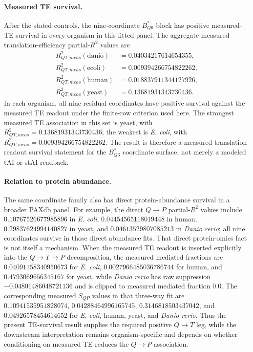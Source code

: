 \paragraph{Measured TE survival.}
After the stated controls, the nine-coordinate $B^{\ast}_{Q6}$ block has positive measured-TE survival in every organism in this fitted panel.  The aggregate measured translation-efficiency partial-$R^2$ values are
$$
\begin{aligned}
R^2_{QT,meas}(\mathrm{danio}) &= 0.04034217614654355,\\
R^2_{QT,meas}(\mathrm{ecoli}) &= 0.009394266754822262,\\
R^2_{QT,meas}(\mathrm{human}) &= 0.018837911344127926,\\
R^2_{QT,meas}(\mathrm{yeast}) &= 0.13681931343730436.
\end{aligned}
$$
In each organism, all nine residual coordinates have positive survival against the measured TE readout under the finite-row criterion used here.  The strongest measured TE association in this set is yeast, with $R^2_{QT,meas}=0.13681931343730436$; the weakest is \emph{E. coli}, with $R^2_{QT,meas}=0.009394266754822262$.  The result is therefore a measured translation-readout survival statement for the $B^{\ast}_{Q6}$ coordinate surface, not merely a modeled tAI or stAI readback.

\paragraph{Relation to protein abundance.}
The same coordinate family also has direct protein-abundance survival in a broader PAXdb panel.  For example, the direct $Q\to P$ partial-$R^2$ values include $0.10767526677985896$ in \emph{E. coli}, $0.04454565118019448$ in human, $0.29837624994140827$ in yeast, and $0.04613529807085213$ in \emph{Danio rerio}; all nine coordinates survive in those direct abundance fits.  That direct protein-omics fact is not itself a mechanism.  When the measured TE readout is inserted explicitly into the $Q\to T\to P$ decomposition, the measured mediated fractions are $0.04091158340950673$ for \emph{E. coli}, $0.0027966485036786744$ for human, and $0.4793069656345167$ for yeast, while \emph{Danio rerio} has raw suppression $-0.04801486048721136$ and is clipped to measured mediated fraction $0.0$.  The corresponding measured $S_{QP}$ values in that three-way fit are $0.10941535951828074$, $0.04288464996165745$, $0.3146818503437042$, and $0.04926578454614652$ for \emph{E. coli}, human, yeast, and \emph{Danio rerio}.  Thus the present TE-survival result supplies the required positive $Q\to T$ leg, while the downstream interpretation remains organism-specific and depends on whether conditioning on measured TE reduces the $Q\to P$ association.

